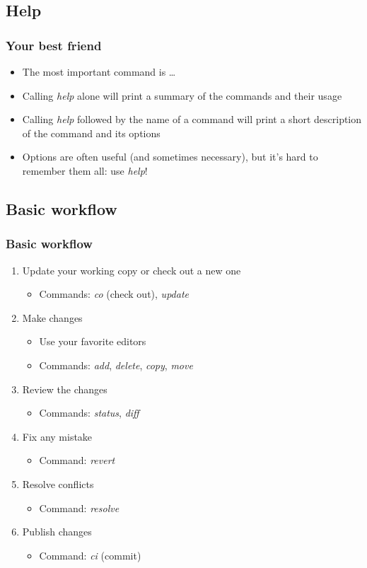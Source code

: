 \documentclass{beamer}
\begin{document}
\subsection{Help}

\frame
{
  \frametitle{Your best friend}
  
  \begin{itemize}
  \item<1-> The most important command is \dots
  		  \uncover<2->{\textit{help}}
  \item<3-> Calling \textit{help} alone will print a summary of the commands and their usage
  \item<4-> Calling \textit{help} followed by the name of a command will print a short description of the command and its options
  \item<5-> Options are often useful (and sometimes necessary), but it's hard to remember them all: use \textit{help}!
  \end{itemize}

}

\subsection{Basic workflow}

\frame
{
  \frametitle{Basic workflow}
  
  \begin{enumerate}
  \item<1-> Update your working copy or check out a new one
  	\begin{itemize}
  	\item<1-> Commands: \textit{co} (check out), \textit{update}
  	\end{itemize}
  \item<2-> Make changes
  	\begin{itemize}
	\item<2-> Use your favorite editors
	\item<2-> Commands: \textit{add}, \textit{delete}, \textit{copy}, \textit{move}
	\end{itemize}
  \item<3-> Review the changes
  	\begin{itemize}
	\item<3-> Commands: \textit{status}, \textit{diff}
	\end{itemize}
  \item<4-> Fix any mistake
  	\begin{itemize}
	\item<4-> Command: \textit{revert}
	\end{itemize}
  \item<5-> Resolve conflicts
  	\begin{itemize}
	\item<4-> Command: \textit{resolve}
	\end{itemize}
  \item<6-> Publish changes
  	\begin{itemize}
	\item<4-> Command: \textit{ci} (commit)
	\end{itemize}
  \end{enumerate}

}
\end{document}
